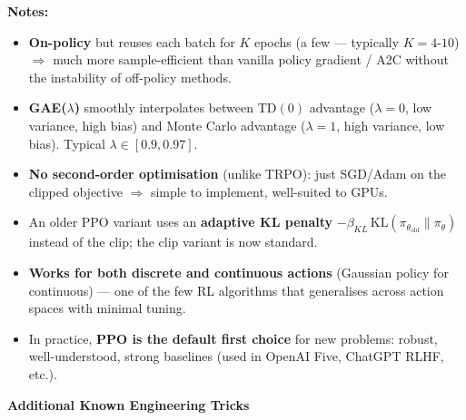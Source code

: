 \documentclass[11pt]{article}
\providecommand{\tightlist}{%
      \setlength{\itemsep}{0pt}\setlength{\parskip}{0pt}}
\begin{document}
\textbf{Notes:}

\begin{itemize}
\tightlist
\item
  \textbf{On-policy} but reuses each batch for \(K\) epochs (a few ---
  typically \(K = 4\)-\(10\)) \(\Rightarrow\) much more sample-efficient
  than vanilla policy gradient / A2C without the instability of
  off-policy methods.
\item
  \textbf{GAE(\(\lambda\))} smoothly interpolates between TD\((0)\)
  advantage (\(\lambda = 0\), low variance, high bias) and Monte Carlo
  advantage (\(\lambda = 1\), high variance, low bias). Typical
  \(\lambda \in [0.9, 0.97]\).
\item
  \textbf{No second-order optimisation} (unlike TRPO): just SGD/Adam on
  the clipped objective \(\Rightarrow\) simple to implement, well-suited
  to GPUs.
\item
  An older PPO variant uses an \textbf{adaptive KL penalty}
  \(-\beta_{KL}\,\mathrm{KL}(\pi_{\theta_\text{old}} \| \pi_\theta)\)
  instead of the clip; the clip variant is now standard.
\item
  \textbf{Works for both discrete and continuous actions} (Gaussian
  policy for continuous) --- one of the few RL algorithms that
  generalises across action spaces with minimal tuning.
\item
  In practice, \textbf{PPO is the default first choice} for new
  problems: robust, well-understood, strong baselines (used in OpenAI
  Five, ChatGPT RLHF, etc.).
\end{itemize}

    \label{tricks-4-7}

    \textbf{Additional Known Engineering Tricks}
\end{document}
